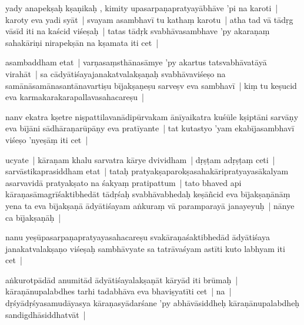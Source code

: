 \documentclass[article,12pt,a4paper]{memoir}%
\newcounter{parCount}
\begin{document}
	  
	  \pstart \leavevmode%
	\label{thakur75-80.19}yady anapekṣaḥ kṣaṇikaḥ , kimity upasarpaṇapratyayābhāve 'pi na karoti | karoty eva yadi syāt | svayam asambhavī tu kathaṃ karotu | atha tad vā tādṛg vāsīd iti na kaścid viśeṣaḥ | tatas tādṛk svabhāvasambhave 'py akaraṇaṃ sahakāriṇi nirapekṣān na kṣamata iti cet |
	{}
	\pend%
      

	  
	  \pstart \leavevmode%
	\label{thakur75-80.23}asambaddham etat | varṇasaṃsthānasāmye 'py akartus tatsvabhāvatāyā virahāt | sa cādyātiśayajanakatvalakṣaṇaḥ svabhāvaviśeṣo na samānāsamānasantānavartiṣu bījakṣaṇeṣu sarveṣv eva sambhavī | kiṃ tu keṣucid eva karmakarakarapallavasahacareṣu |
	{}
	\pend%
      

	  
	  \pstart \leavevmode%
	\label{thakur75-80.26}nanv ekatra kṣetre niṣpattilavanādipūrvakam ānīyaikatra kuśūle kṣiptāni sarvāṇy eva bījāni sādhāraṇarūpāṇy eva pratīyante | tat kutastyo 'yam ekabījasambhavī viśeṣo 'nyeṣāṃ iti cet | 
	{}
	\pend%
      

	  
	  \pstart \leavevmode%
	\label{thakur75-80.28}ucyate | kāraṇam khalu sarvatra kārye dvividham | dṛṣṭam adṛṣṭaṃ ceti | sarvāstikaprasiddham etat | tataḥ pratyakṣaparokṣasahakāripratyayasākalyam asarvavidā pratyakṣato na śakyaṃ pratipattum | tato bhaved api kāraṇasāmagrīśaktibhedāt tādṛśaḥ svabhāvabhedaḥ keṣāñcid eva bījakṣaṇānāṃ yena ta eva bījakṣaṇā ādyātiśayam aṅkuraṃ vā paramparayā janayeyuḥ | nānye ca bījakṣaṇāḥ |
	{}
	\pend%
      

	  
	  \pstart \leavevmode%
	\label{thakur75-81.5}nanu yeṣūpasarpaṇapratyayasahacareṣu svakāraṇaśaktibhedād ādyātiśaya janakatvalakṣaṇo viśeṣaḥ sambhāvyate sa tatrāvaśyam astīti kuto labhyam iti cet | 
	{}
	\pend%
      

	  
	  \pstart \leavevmode%
	\label{thakur75-81.6}aṅkurotpādād anumitād ādyātiśayalakṣaṇāt kāryād iti brūmaḥ | kāraṇānupalabdhes tarhi tadabhāva eva bhaviṣyatīti cet | na | dṛśyādṛśyasamudāyasya kāraṇasyādarśane 'py abhāvāsiddheḥ kāraṇānupalabdheḥ sandigdhāsiddhatvāt |
	{}
	\pend%
      
\end{document}
